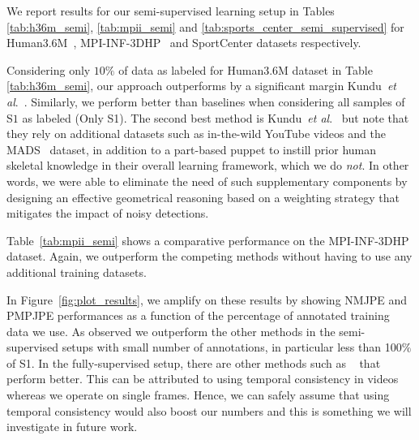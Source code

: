 \documentclass[runningheads]{llncs}
\def\etal{\emph{et al}.}     \usepackage[pagebackref=true,breaklinks=true,colorlinks,bookmarks=false]{hyperref}
\begin{document}
We report results for our semi-supervised learning setup in Tables \ref{tab:h36m_semi}, \ref{tab:mpii_semi} and \ref{tab:sports_center_semi_supervised} for Human3.6M~\cite{Ionescu14a}, MPI-INF-3DHP~\cite{Mehta17a} and SportCenter datasets respectively. 

Considering only $10 \%$ of data as labeled for Human3.6M dataset in Table \ref{tab:h36m_semi},  our approach outperforms by a significant margin Kundu~\etal~\cite{Kundu20}. Similarly, we perform better than baselines when considering all samples of S$1$ as labeled (Only S1). The second best method is Kundu~\etal~\cite{Kundu20} but note that they rely on additional datasets such as in-the-wild YouTube videos and the MADS~\cite{Zhang17f} dataset, in addition to a part-based puppet to instill prior human skeletal knowledge in their overall learning framework, which we do {\it not}. In other words, we were able to eliminate  the need of such supplementary components by designing an effective geometrical reasoning based on a weighting strategy that mitigates the impact of noisy detections. 

Table~\ref{tab:mpii_semi} shows a comparative performance on the MPI-INF-3DHP dataset. Again, we outperform the competing methods without having to use any additional training datasets. 

In Figure~\ref{fig:plot_results}, we amplify on these results by showing NMJPE and PMPJPE performances as a function of the percentage of annotated training data we use. As observed we outperform the other methods in the semi-supervised setups with small number of annotations, in particular less than 100$\%$ of S1. In the fully-supervised setup, there are other methods such as ~\cite{Pavllo19} that perform better. This can be attributed to using temporal consistency in videos whereas we operate on single frames. Hence, we can safely assume that using temporal consistency would also boost our numbers and this is something we will investigate in future work.

\begin{figure*}[t]
    \centering
    \quad
{}\caption{\small Comparison with Pavllo~\etal~\cite{Pavllo19}, Kundu~\etal~\cite{Kundu20} and our semi-supervised variant with the triangulation of Iskakov~\cite{Iskakov19} on (left) NMPJPE and (right) PMPJPE metrics on Human3.6m with different amount of supervision.}
    \label{fig:plot_results}
\end{figure*}
 
\end{document}
